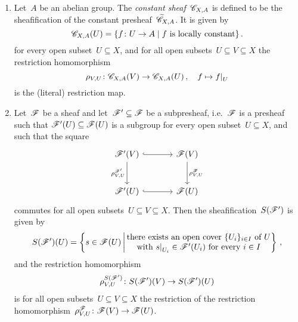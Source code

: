 \begin{example}
\begin{enumerate}
      \begin{examplenonum}[Sheafificaton]
        \leavevmode
        \begin{enumerate}
          \item
            Let~$A$ be an abelian group.
            The \emph{constant sheaf}~$\mathscr{C}_{X,A}$ is defined to be the sheafification of the constant presheaf~$\widetilde{\mathscr{C}}_{X,A}$.
            It is given by
            \[
                \Cs_{X,A}(U)
              = \{
                  f \colon U \to A
                \suchthat
                  \text{$f$ is locally constant}
                \} \,.
            \]
            for every open subset~$U \subseteq X$, and for all open subsets~$U \subseteq V \subseteq X$ the restriction homomorphism
            \[
                      \rho_{V,U}
              \colon  \Cs_{X,A}(V)
              \to     \Cs_{X,A}(U) \,,
              \quad   f
              \mapsto \restrict{f}{U}
            \]
            is the (literal) restriction map.
          \item
            Let~$\mathscr{F}$ be a sheaf and let~$\mathscr{F}' \subseteq \mathscr{F}$ be a subpresheaf, i.e.~$\mathscr{F}$ is a presheaf such that $\mathscr{F}'(U) \subseteq \mathscr{F}(U)$ is a subgroup for every open subset~$U \subseteq X$, and such that the square
            \[
              \begin{tikzcd}[sep = large]
                  \Fs'(V)
                  \arrow[hook]{r}
                  \arrow{d}[left]{\rho^{\Fs'}_{V,U}}
                & \Fs(V)
                  \arrow{d}[right]{\rho^\Fs_{V,U}}
                \\
                  \Fs'(U)
                  \arrow[hook]{r}
                & \Fs(U)
              \end{tikzcd}
            \]
            commutes for all open subsets~$U \subseteq V \subseteq X$.
            Then the sheafification~$S(\mathscr{F}')$ is given by
            \[
                S(\Fs')(U)
              = \left\{
                  s \in \Fs(U)
                \suchthat*
                  \begin{tabular}{@{}c@{}}
                    there exists an open cover~$\{U_i\}_{i \in I}$ of~$U$ \\
                    with~$\restrict{s}{U_i} \in \Fs'(U_i)$ for every~$i\in I$
                  \end{tabular}
                \right\} \,,
            \]
            and the restriction homomorphism
            \[
                      \rho_{V,U}^{S(\mathscr{F}')}
              \colon  S(\mathscr{F}')(V)
              \to     S(\mathscr{F}')(U)
            \]
            is for all open subsets~$U \subseteq V \subseteq X$ the restriction of the restriction homomorphism~$\rho_{V,U}^{\mathscr{F}} \colon \mathscr{F}(V) \to \mathscr{F}(U)$.
            

\end{enumerate}
\end{examplenonum}
\end{enumerate}
\end{example}
